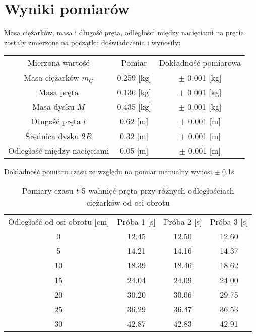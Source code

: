 \documentclass[10pt,a4paper]{article}
\newcommand{\forceindent}{\leavevmode{\parindent=3em\indent}}
\begin{document}
\section{Wyniki pomiarów}
\forceindent Masa ciężarków, masa i długość pręta, odległości między nacięciami na pręcie zostały zmierzone na początku doświadczenia i wynosiły:\\
\begin{center}
\begin{tabular}{|c|c|c|}
\hline
Mierzona wartość & Pomiar & Dokładność pomiarowa\\
\hhline{|=|=|=|}
Masa ciężarków $m_C$ & 0.259 [kg] & $\pm$ 0.001 [kg]\\
Masa pręta & 0.136 [kg] & $\pm$ 0.001 [kg]\\
Masa dysku $M$& 0.435 [kg] & $\pm$ 0.001 [kg]\\
\hline
Długość pręta $l$& 0.62 [m] & $\pm$ 0.001 [m]\\
Średnica dysku 2$R$ & 0.32 [m] & $\pm$ 0.001 [m]\\
\hline
Odległość między nacięciami & 0.05 [m] & $\pm$ 0.001 [m]\\
\hline

\end{tabular}
\end{center}
\vspace{10pt}

\forceindent Dokładność pomiaru czasu ze względu na pomiar manualny wynosi $\pm$ 0.1s
\vspace{10pt}
\begin{table}[!h]
\centering
\begin{tabular}{|c||c|c|c|}
\hline
Odległość od osi obrotu [cm]& Próba 1 [s] & Próba 2 [s] & Próba 3 [s] \\
\hhline{|=||=|=|=|}
0 & 12.45 & 12.50 & 12.60 \\
5 & 14.21 & 14.16 & 14.37 \\ 
10 & 18.39 & 18.46 & 18.62 \\
15 & 24.04 & 24.09 & 24.00 \\
20 & 30.20 & 30.06 & 29.75 \\
25 & 36.29 & 36.47 & 36.53 \\
30 & 42.87 & 42.83 & 42.91 \\
\hline

\end{tabular}
\caption{Pomiary czasu $t$ 5 wahnięć pręta przy różnych odległościach ciężarków od osi obrotu}
\end{table}
\vspace{10pt}
\end{document}

